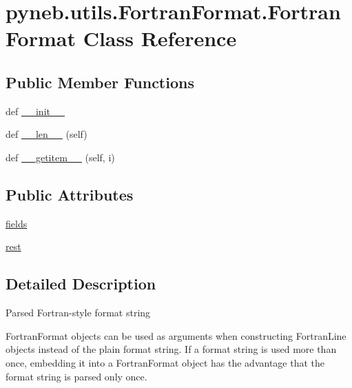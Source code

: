 \hypertarget{classpyneb_1_1utils_1_1_fortran_format_1_1_fortran_format}{}\section{pyneb.\+utils.\+Fortran\+Format.\+Fortran\+Format Class Reference}
\label{classpyneb_1_1utils_1_1_fortran_format_1_1_fortran_format}
\subsection*{Public Member Functions}
\begin{DoxyCompactItemize}
\item 
def \hyperlink{classpyneb_1_1utils_1_1_fortran_format_1_1_fortran_format_a7fc0109f1fa73801ad3795463473e41a}{\+\_\+\+\_\+init\+\_\+\+\_\+}
\item 
def \hyperlink{classpyneb_1_1utils_1_1_fortran_format_1_1_fortran_format_abd54b6a502a35a8e4dabcbcb0632cff7}{\+\_\+\+\_\+len\+\_\+\+\_\+} (self)
\item 
def \hyperlink{classpyneb_1_1utils_1_1_fortran_format_1_1_fortran_format_a8fc69af902245845b7fceba5e8f7974f}{\+\_\+\+\_\+getitem\+\_\+\+\_\+} (self, i)
\end{DoxyCompactItemize}
\subsection*{Public Attributes}
\begin{DoxyCompactItemize}
\item 
\hyperlink{classpyneb_1_1utils_1_1_fortran_format_1_1_fortran_format_ac8f962282ba9e35ccd8dad5feacd3813}{fields}
\item 
\hyperlink{classpyneb_1_1utils_1_1_fortran_format_1_1_fortran_format_a6567d6b3709b1db086972c2fe1855006}{rest}
\end{DoxyCompactItemize}


\subsection{Detailed Description}
\begin{DoxyVerb}Parsed Fortran-style format string

FortranFormat objects can be used as arguments when constructing
FortranLine objects instead of the plain format string. If a
format string is used more than once, embedding it into a FortranFormat
object has the advantage that the format string is parsed only once.
\end{DoxyVerb}
 

